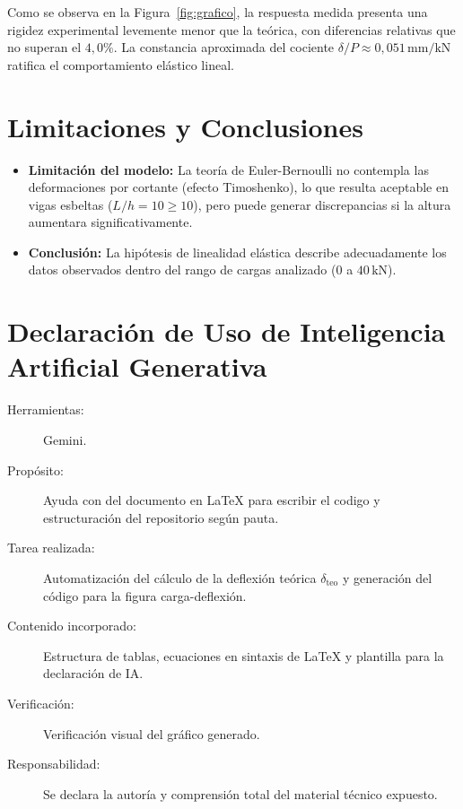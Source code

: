 \documentclass[11pt,a4paper]{article}
\begin{document}
Como se observa en la Figura~\ref{fig:grafico}, la respuesta medida presenta una rigidez experimental levemente menor que la teórica, con diferencias relativas que no superan el $4{,}0\%$. La constancia aproximada del cociente $\delta/P \approx 0{,}051\,\text{mm/kN}$ ratifica el comportamiento elástico lineal.

\section{Limitaciones y Conclusiones}
\begin{itemize}
    \item \textbf{Limitación del modelo:} La teoría de Euler-Bernoulli no contempla las deformaciones por cortante (efecto Timoshenko), lo que resulta aceptable en vigas esbeltas ($L/h = 10 \ge 10$), pero puede generar discrepancias si la altura aumentara significativamente.
    \item \textbf{Conclusión:} La hipótesis de linealidad elástica describe adecuadamente los datos observados dentro del rango de cargas analizado ($0$ a $40\,\text{kN}$).
\end{itemize}




\appendix
\section{Declaración de Uso de Inteligencia Artificial Generativa}

\begin{description}
    \item[Herramientas:] Gemini.
    \item[Propósito:] Ayuda con del documento en \LaTeX{} para escribir el codigo y estructuración del repositorio según pauta.
    \item[Tarea realizada:] Automatización del cálculo de la deflexión teórica $\delta_{\text{teo}}$ y generación del código para la figura carga-deflexión.
    \item[Contenido incorporado:] Estructura de tablas, ecuaciones en sintaxis de \LaTeX{} y plantilla para la declaración de IA.
    \item[Verificación:] Verificación visual del gráfico generado.
    \item[Responsabilidad:] Se declara la autoría y comprensión total del material técnico expuesto.
\end{description}
\end{document}
